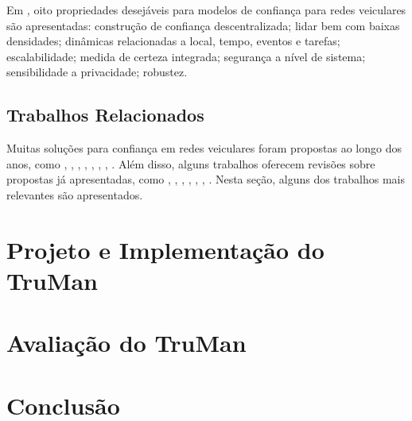 \begin{resumoextendido}
	Em \citep{zhang2011survey}, oito propriedades desejáveis para modelos de confiança para redes veiculares são apresentadas:
	construção de confiança descentralizada;
	lidar bem com baixas densidades;
	dinâmicas relacionadas a local, tempo, eventos e tarefas;
	escalabilidade;
	medida de certeza integrada;
	segurança a nível de sistema;
	sensibilidade a privacidade;
	robustez.
	
	\subsection*{Trabalhos Relacionados}
	
	Muitas soluções para confiança em redes veiculares foram propostas ao longo dos anos, como \citep{patwardhan2006data}, \citep{gerlach2007trust}, \citep{raya2008data}, \citep{huang2010situation}, \citep{ding2013novel}, \citep{haddadou2013trust}, \citep{liu2016lsot}, \citep{kerrache2016detection}.
	Além disso, alguns trabalhos oferecem revisões sobre propostas já apresentadas, como \citep{zhang2011survey}, \citep{ma2011survey}, \citep{zhang2012trust}, \cite{mejri2014survey}, \citep{soleymani2015trust}, \citep{sengar2016survey}, \citep{dwivedi2016review}.
	Nesta seção, alguns dos trabalhos mais relevantes são apresentados.
	
	\citep{minhas2010towards}
	
	\citep{chen2010trust}
	
	\citep{li2016art}
	
	\citep{chen2017cloud}
	
	\section*{Projeto e Implementação do TruMan}
	
	\section*{Avaliação do TruMan}
	
	\section*{Conclusão}
\end{resumoextendido}